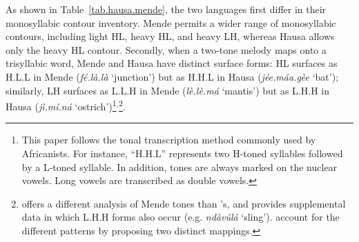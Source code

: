 \documentclass{CUP-JNL-PHO}%
\theoremstyle{definition}
\numberwithin{equation}{section}
\theoremstyle{definition}
\begin{document}
  
As shown in Table~\ref{tab.hausa.mende}, the two languages first differ in their
monosyllabic contour inventory. Mende permits a wider range of monosyllabic contours, including light HL, heavy HL, 
and heavy LH, whereas Hausa allows only the heavy HL contour. 
Secondly, when a two-tone melody maps onto a trisyllabic word, Mende and 
Hausa have distinct surface forms: 
HL surfaces as H.L.L in Mende (\textit{fé.là.là} `junction') but as H.H.L in Hausa 
(\textit{jée.máa.gèe} `bat'); similarly, LH surfaces as L.L.H in Mende 
(\textit{lè.lè.má} `mantis') but as L.H.H in Hausa (\textit{jì.mí.ná} 
`ostrich')\footnote{This
	paper follows the
	tonal transcription method commonly used by Africanists. For
	instance, ``H.H.L'' represents two H-toned syllables followed 
	by a L-toned syllable. In addition, tones are always
	marked on the nuclear vowels. Long
	vowels are transcribed as double vowels.}\(^,\)\footnote{\citet{dwyerMende1978} offers a different
	analysis of Mende tones than \citet{lebenRepresentationTone1978}'s,
	and provides supplemental data in which L.H.H forms also occur (e.g.
	\textit{ndàvúlá} `sling'). \citet{lebenRepresentationTone1978}
	account for the different patterns by proposing two distinct
	mappings.}.
\end{document}
